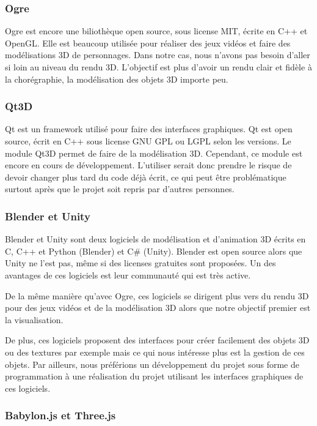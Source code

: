 \subsubsection{Ogre}

Ogre est encore une biliothèque open source, sous license MIT, écrite en C++ et OpenGL. Elle est beaucoup utilisée pour réaliser des jeux vidéos et faire des modélisations 3D de personnages. Dans notre cas, nous n'avons pas besoin d'aller si loin au niveau du rendu 3D. L'objectif est plus d'avoir un rendu clair et fidèle à la chorégraphie, la modélisation des objets 3D importe peu. 


\subsubsection{Qt3D}

Qt est un framework utilisé pour faire des interfaces graphiques. Qt est open source, écrit en C++ sous license GNU GPL ou LGPL selon les versions. Le module Qt3D permet de faire de la modélisation 3D. Cependant, ce module est encore en cours de développement. L'utiliser serait donc prendre le risque de devoir changer plus tard du code déjà écrit, ce qui peut être problématique surtout après que le projet soit repris par d'autres personnes. 

\subsubsection{Blender et Unity}

Blender et Unity sont deux logiciels de modélisation et d'animation 3D écrits en C, C++ et Python (Blender) et C\# (Unity). Blender est open source alors que Unity ne l'est pas, même si des licenses gratuites sont proposées. Un des avantages de ces logiciels est leur communauté qui est très active.

De la même manière qu'avec Ogre, ces logiciels se dirigent plus vers du rendu 3D pour des jeux vidéos et de la modélisation 3D alors que notre objectif premier est la visualisation. 

De plus, ces logiciels proposent des interfaces pour créer facilement des objets 3D ou des textures par exemple mais ce qui nous intéresse plus est la gestion de ces objets. Par ailleurs, nous préférions un développement du projet sous forme de programmation à une réalisation du projet utilisant les interfaces graphiques de ces logiciels.

\subsubsection{Babylon.js et Three.js}

